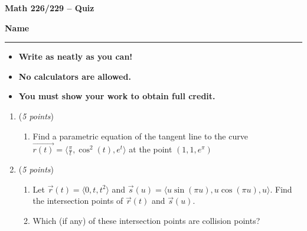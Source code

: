 \documentclass[12 pt]{article}
\begin{document}
  \begin{center}
    \textbf{\hfill Math 226/229 -- Quiz} \\
  \end{center}
  \medskip

  \noindent
  \textbf{Name}\ \rule{3.5in}{.4pt} \hfill
  \vspace{.1in}
  \hspace*{0.2in}
  \begin{itemize}
    \item \textbf{Write as neatly as you can!}
    \item \textbf{No calculators are allowed.}
    \item \textbf{You must show your work to obtain full credit.}
  \end{itemize}

	\medskip
  \noindent

  \begin{enumerate}
    \item (\textit{5 points})
    \begin{enumerate}
	  \item Find a parametric equation of the tangent line to the curve $\vec{r(t)}=\langle\frac{\pi}{t}, \cos^{2}(t),e^t\rangle$ at the point $\left(1,1,e^\pi\right)$
	\end{enumerate}
		\vspace{2in}
		\item (\textit{5 points})
		\begin{enumerate}
			\item Let $\vec{r}\left(t\right)=\langle0,t,t^2\rangle$ and $\vec{s}\left(u\right)=\langle u\sin\left(\pi u\right),u\cos\left(\pi u\right),u\rangle$. Find the intersection points of $\vec{r}\left(t\right)$ and $\vec{s}\left(u\right)$.
			\item Which (if any) of these intersection points are collision points?
		\end{enumerate}
  \end{enumerate}
\end{document}
